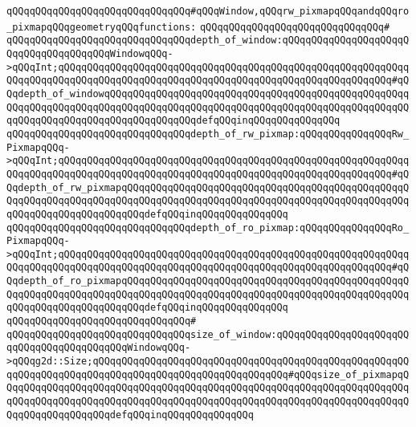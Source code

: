 \verb|qQQqqQQqqQQqqQQqqQQqqQQqqQQqqQQq#qQQqWindow,qQQqrw_pixmapqQQqandqQQqro_pixmapqQQqgeometryqQQqfunctions:|\newline
\verb|qQQqqQQqqQQqqQQqqQQqqQQqqQQqqQQq#|\newline
\verb|qQQqqQQqqQQqqQQqqQQqqQQqqQQqqQQqdepth_of_window:qQQqqQQqqQQqqQQqqQQqqQQqqQQqqQQqqQQqqQQqWindowqQQq->qQQqInt;qQQqqQQqqQQqqQQqqQQqqQQqqQQqqQQqqQQqqQQqqQQqqQQqqQQqqQQqqQQqqQQqqQQqqQQqqQQqqQQqqQQqqQQqqQQqqQQqqQQqqQQqqQQqqQQqqQQqqQQqqQQqqQQq#qQQqdepth_of_windowqQQqqQQqqQQqqQQqqQQqqQQqqQQqqQQqqQQqqQQqqQQqqQQqqQQqqQQqqQQqqQQqqQQqqQQqqQQqqQQqqQQqqQQqqQQqqQQqqQQqqQQqqQQqqQQqqQQqqQQqqQQqqQQqqQQqqQQqqQQqqQQqqQQqqQQqqQQqdefqQQqinqQQqqQQqqQQqqQQq|\newline
\verb|qQQqqQQqqQQqqQQqqQQqqQQqqQQqqQQqdepth_of_rw_pixmap:qQQqqQQqqQQqqQQqRw_PixmapqQQq->qQQqInt;qQQqqQQqqQQqqQQqqQQqqQQqqQQqqQQqqQQqqQQqqQQqqQQqqQQqqQQqqQQqqQQqqQQqqQQqqQQqqQQqqQQqqQQqqQQqqQQqqQQqqQQqqQQqqQQqqQQqqQQqqQQqqQQq#qQQqdepth_of_rw_pixmapqQQqqQQqqQQqqQQqqQQqqQQqqQQqqQQqqQQqqQQqqQQqqQQqqQQqqQQqqQQqqQQqqQQqqQQqqQQqqQQqqQQqqQQqqQQqqQQqqQQqqQQqqQQqqQQqqQQqqQQqqQQqqQQqqQQqqQQqqQQqqQQqdefqQQqinqQQqqQQqqQQqqQQq|\newline
\verb|qQQqqQQqqQQqqQQqqQQqqQQqqQQqqQQqdepth_of_ro_pixmap:qQQqqQQqqQQqqQQqRo_PixmapqQQq->qQQqInt;qQQqqQQqqQQqqQQqqQQqqQQqqQQqqQQqqQQqqQQqqQQqqQQqqQQqqQQqqQQqqQQqqQQqqQQqqQQqqQQqqQQqqQQqqQQqqQQqqQQqqQQqqQQqqQQqqQQqqQQqqQQqqQQq#qQQqdepth_of_ro_pixmapqQQqqQQqqQQqqQQqqQQqqQQqqQQqqQQqqQQqqQQqqQQqqQQqqQQqqQQqqQQqqQQqqQQqqQQqqQQqqQQqqQQqqQQqqQQqqQQqqQQqqQQqqQQqqQQqqQQqqQQqqQQqqQQqqQQqqQQqqQQqqQQqdefqQQqinqQQqqQQqqQQqqQQq|\newline
\verb|qQQqqQQqqQQqqQQqqQQqqQQqqQQqqQQq#|\newline
\verb|qQQqqQQqqQQqqQQqqQQqqQQqqQQqqQQqsize_of_window:qQQqqQQqqQQqqQQqqQQqqQQqqQQqqQQqqQQqqQQqqQQqWindowqQQq->qQQqg2d::Size;qQQqqQQqqQQqqQQqqQQqqQQqqQQqqQQqqQQqqQQqqQQqqQQqqQQqqQQqqQQqqQQqqQQqqQQqqQQqqQQqqQQqqQQqqQQqqQQqqQQqqQQq#qQQqsize_of_pixmapqQQqqQQqqQQqqQQqqQQqqQQqqQQqqQQqqQQqqQQqqQQqqQQqqQQqqQQqqQQqqQQqqQQqqQQqqQQqqQQqqQQqqQQqqQQqqQQqqQQqqQQqqQQqqQQqqQQqqQQqqQQqqQQqqQQqqQQqqQQqqQQqqQQqqQQqqQQqqQQqdefqQQqinqQQqqQQqqQQqqQQq|\newline
